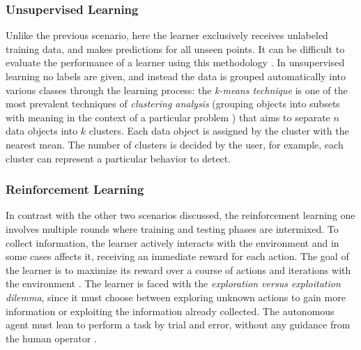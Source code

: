
\subsubsection{Unsupervised Learning}
\label{subsubsec:unsupervised-learning}

Unlike the previous scenario, here the learner exclusively receives unlabeled training data, and makes predictions for all unseen points. It can be difficult to evaluate the performance of a learner using this methodology \cite[p. 6]{Mohri2018}. In unsupervised learning no labels are given, and instead the data is grouped automatically into various classes through the learning process: the \textit{k-means technique} is one of the most prevalent techniques of \textit{clustering analysis} (grouping objects into subsets with meaning in the context of a particular problem \cite{Annachhatre2015}) that aims to separate $n$ data objects into $k$ clusters. Each data object is assigned by the cluster with the nearest mean. The number of clusters is decided by the user, for example, each cluster can represent a particular behavior to detect.


\subsubsection{Reinforcement Learning}
\label{subsubsec:reinforcement-learning}

In contrast with the other two scenarios discussed, the reinforcement learning one involves multiple rounds where training and testing phases are intermixed. To collect information, the learner actively interacts with the environment and in some cases affects it, receiving an immediate reward for each action. The goal of the learner is to maximize its reward over a course of actions and iterations with the environment \cite[p. 7]{Mohri2018}. The learner is faced with the \textit{exploration versus exploitation dilemma}, since it must choose between exploring unknown actions to gain more information or exploiting the information already collected. The autonomous agent must lean to perform a task by trial and error, without any guidance from the human operator \cite[p. 25]{Goodfellow2016}.

